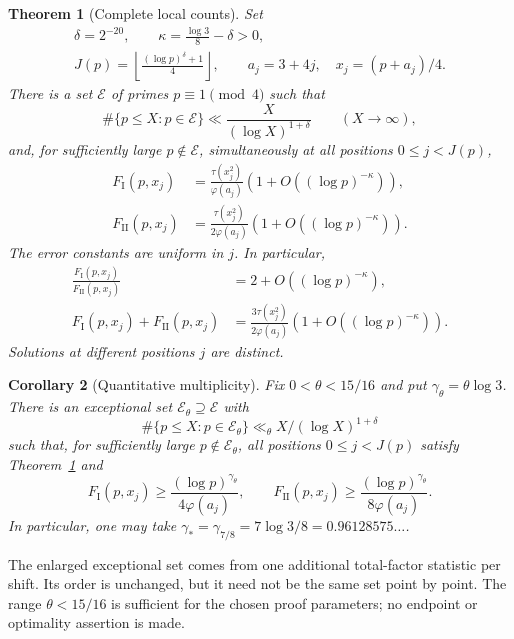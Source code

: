 \documentclass[11pt]{article}
\newtheorem{theorem}{Theorem}[section]
\newtheorem{corollary}[theorem]{Corollary}
\theoremstyle{remark}\newtheorem{remark}[theorem]{Remark}
\newcommand{\FI}{F_{\mathrm I}}
\newcommand{\FII}{F_{\mathrm {II}}}
\begin{document}
\begin{theorem}[Complete local counts]\label{thm:main}
Set
\[
\begin{gathered}
 \delta=2^{-20},\qquad \kappa=\frac{\log3}{8}-\delta>0,\\
 J(p)=\left\lfloor\frac{(\log p)^\delta+1}{4}\right\rfloor,
 \qquad a_j=3+4j,\quad x_j=(p+a_j)/4.
\end{gathered}
\]
There is a set $\mathcal E$ of primes $p\equiv1\pmod4$ such that
\begin{equation}\label{eq:global-exception}
 \#\{p\le X:p\in\mathcal E\}\ll\frac{X}{(\log X)^{1+\delta}}
 \qquad(X\to\infty),
\end{equation}
and, for sufficiently large $p\notin\mathcal E$, simultaneously at
all positions $0\le j<J(p)$,
\begin{align}
 \FI(p,x_j)
 &=\frac{\tau(x_j^2)}{\varphi(a_j)}
       \left(1+O((\log p)^{-\kappa})\right),\label{eq:main-I}\\
 \FII(p,x_j)
 &=\frac{\tau(x_j^2)}{2\varphi(a_j)}
       \left(1+O((\log p)^{-\kappa})\right).\label{eq:main-II}
\end{align}
The error constants are uniform in $j$. In particular,
\begin{equation}\label{eq:ratio-total}
\begin{aligned}
 \frac{\FI(p,x_j)}{\FII(p,x_j)}
 &=2+O((\log p)^{-\kappa}),\\
 \FI(p,x_j)+\FII(p,x_j)
 &=\frac{3\tau(x_j^2)}{2\varphi(a_j)}
       \left(1+O((\log p)^{-\kappa})\right).
\end{aligned}
\end{equation}
Solutions at different positions $j$ are distinct.
\end{theorem}

\begin{corollary}[Quantitative multiplicity]\label{cor:many}
Fix $0<\theta<15/16$ and put $\gamma_\theta=\theta\log3$.
There is an exceptional set $\mathcal E_\theta\supseteq\mathcal E$ with
\[
 \#\{p\le X:p\in\mathcal E_\theta\}
 \ll_\theta X/(\log X)^{1+\delta}
\]
such that, for sufficiently large $p\notin\mathcal E_\theta$, all
positions $0\le j<J(p)$ satisfy Theorem~\ref{thm:main} and
\begin{equation}\label{eq:many}
 \FI(p,x_j)\ge\frac{(\log p)^{\gamma_\theta}}{4\varphi(a_j)},
 \qquad
 \FII(p,x_j)\ge\frac{(\log p)^{\gamma_\theta}}{8\varphi(a_j)}.
\end{equation}
In particular, one may take
$\gamma_*=\gamma_{7/8}=7\log3/8=0.96128575\ldots$.
\end{corollary}
The enlarged exceptional set comes from one additional total-factor
statistic per shift. Its order is unchanged, but it need not be the
same set point by point. The range $\theta<15/16$ is sufficient for the
chosen proof parameters; no endpoint or optimality assertion is made.
\end{document}
